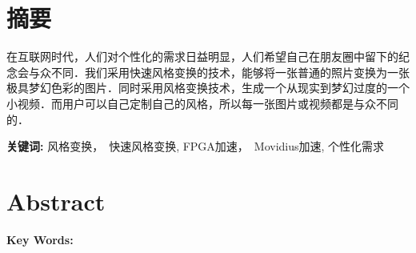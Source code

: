 \section*{ \centering 摘要}
在互联网时代，人们对个性化的需求日益明显，人们希望自己在朋友圈中留下的纪念会与众不同．我们采用快速风格变换的技术，能够将一张普通的照片变换为一张极具梦幻色彩的图片．同时采用风格变换技术，生成一个从现实到梦幻过度的一个小视频．而用户可以自己定制自己的风格，所以每一张图片或视频都是与众不同的．

\vskip0.5cm

\textbf{关键词:}  风格变换，　快速风格变换, FPGA加速，　Movidius加速, 个性化需求

\clearpage
\section*{ \centering \textbf{Abstract} }
\textbf{Key Words:}




